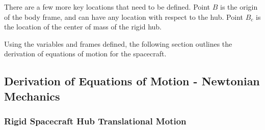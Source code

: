 There are a few more key locations that need to be defined. Point $B$ is the origin of the body frame, and can have any location with respect to the hub. Point $B_c$ is the location of the center of mass of the rigid hub.

Using the variables and frames defined, the following section outlines the derivation of equations of motion for the spacecraft.

\subsection{Derivation of Equations of Motion - Newtonian Mechanics}

\subsubsection{Rigid Spacecraft Hub Translational Motion}

